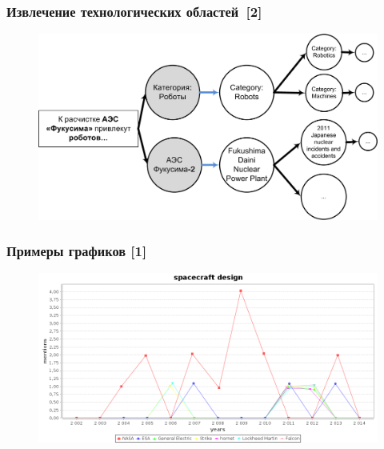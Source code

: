 \documentclass{beamer}
\begin{document}

\begin{frame}\frametitle{Извлечение технологических областей~[2]}

\begin{figure}[ht]
\begin{center}
\includegraphics[width=4.5in]{Process.png}
\end{center}
\end{figure}

\end{frame}

\begin{frame}\frametitle{Примеры графиков [1]}
\begin{figure}[ht]
\begin{center}
\includegraphics[width=4.5in]{space.png}
\end{center}
\end{figure}
\end{frame}
\end{document}
